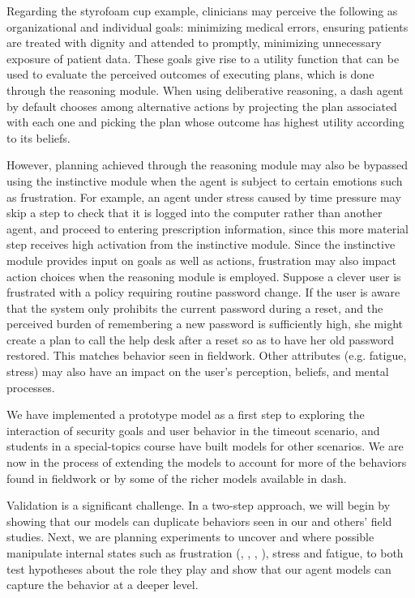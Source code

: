 \documentclass{acm_proc_article-sp}
\newcommand{\ignore}[1] {}
\begin{document}
Regarding the styrofoam cup example, clinicians may perceive the
following as organizational and individual goals: minimizing medical
errors, ensuring patients are treated with dignity and attended to
promptly, minimizing unnecessary exposure of patient
data. \ignore{Individual goals may include things like providing
  superior patient care and finishing the current task adequately but
  quickly.}  These goals give rise to a utility function that can be
used to evaluate the perceived outcomes of executing plans, which is
done through the reasoning module. When using deliberative reasoning,
a {\sc dash} agent by default chooses among alternative actions by
projecting the plan associated with each one and picking the plan
whose outcome has highest utility according to its beliefs.

However, planning achieved through the reasoning module may also be
bypassed using the instinctive module when the agent is subject to
certain emotions such as frustration. For example, an agent under
stress caused by time pressure may skip a step to check that it is
logged into the computer rather than another agent, and proceed to
entering prescription information, since this more material step
receives high activation from the instinctive module. Since the
instinctive module provides input on goals as well as actions,
frustration may also impact action choices when the reasoning module
is employed. Suppose a clever user is frustrated with a policy
requiring routine password change. If the user is aware that the
system only prohibits the current password during a reset, and the
perceived burden of remembering a new password is sufficiently high,
she might create a plan to call the help desk after a reset so as to
have her old password restored. This matches behavior seen in
fieldwork.  Other attributes (e.g. fatigue, stress) may also have an
impact on the user's perception, beliefs, and mental processes.
 
We have implemented a prototype model as a first step to exploring the
interaction of security goals and user behavior in the timeout
scenario, and students in a special-topics course have built models
for other scenarios. We are now in the process of extending the models
to account for more of the behaviors found in fieldwork or by some of
the richer models available in {\sc dash}.

Validation is a significant challenge. In a two-step approach, we will
begin by showing that our models can duplicate behaviors seen in our and others'
field studies. Next, we are planning experiments to uncover and where
possible manipulate internal states such as frustration
(\cite{hazlett2003measurement}, \cite{kapoor2007automatic},
\cite{klein2002computer}, \cite{reynolds2001sensing}), stress and
fatigue, to both test hypotheses about the role they play and show
that our agent models can capture the behavior at a deeper level.
\end{document}
